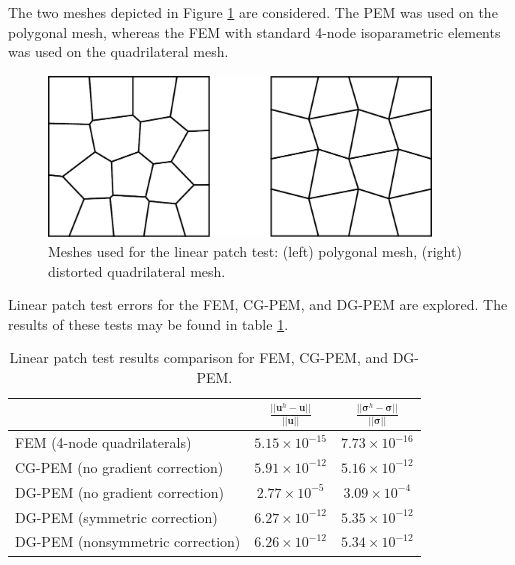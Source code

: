 The two meshes depicted in Figure \ref{fig:patch_test_meshes} are considered. The PEM was used on the polygonal mesh, whereas the FEM with standard 4-node isoparametric elements was used on the quadrilateral mesh.
\begin{figure}[!h]
    \centering
    \includegraphics[width=4.0in]{figures/patch_test_meshes.pdf}
    	\caption{Meshes used for the linear patch test: (left) polygonal mesh, (right) distorted quadrilateral mesh.}
    \label{fig:patch_test_meshes}
\end{figure}

Linear patch test errors for the FEM, CG-PEM, and DG-PEM are explored. The results of these tests may be found in table \ref{tab:linear_patch_test}.

\begin{table}[!ht]
  \begin{center}
    \begin{tabular}{| l || c | c |}
    \hline
           & $\frac{||\bm{u}^h - \bm{u}||}{||\bm{u}||}$ & $\frac{||\boldsymbol{\sigma}^h - \boldsymbol{\sigma}||}{||\boldsymbol{\sigma}||}$ \\ \hline \hline
    FEM (4-node quadrilaterals) & $5.15 \times 10^{-15}$ & $7.73 \times 10^{-16}$ \\ \hline
    CG-PEM (no gradient correction) & $5.91 \times 10^{-12}$ & $5.16 \times 10^{-12}$ \\ \hline
    DG-PEM (no gradient correction) & $2.77 \times 10^{-5}$ & $3.09 \times 10^{-4}$ \\ \hline
    DG-PEM (symmetric correction) & $6.27 \times 10^{-12}$ & $5.35 \times 10^{-12}$ \\ \hline
    DG-PEM (nonsymmetric correction) & $6.26 \times 10^{-12}$ & $5.34 \times 10^{-12}$ \\
    \hline
    \end{tabular}
    \caption{Linear patch test results comparison for FEM, CG-PEM, and DG-PEM.}
    \vspace{-5pt}
    \label{tab:linear_patch_test}
    \vspace{-10pt}
  \end{center}
\end{table}


